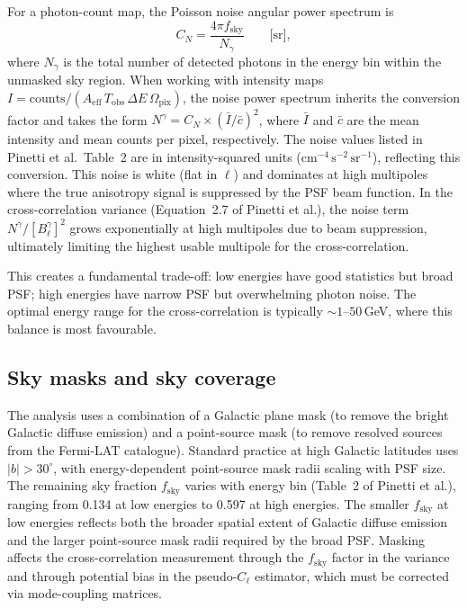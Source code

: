 \documentclass[10pt,a4paper]{article}
\newcommand{\fsky}{f_{\mathrm{sky}}}
\newcommand{\Nph}{N^{\gamma}}
\newcommand{\Cl}{C_\ell}
\begin{document}
For a photon-count map, the Poisson noise angular power spectrum is
\begin{equation}
    C_N = \frac{4\pi \fsky}{N_\gamma}\qquad\text{[sr]},
\end{equation}
where $N_\gamma$ is the total number of detected photons in the energy bin within the unmasked sky region. When working with intensity maps $I = \mathrm{counts}/(A_{\mathrm{eff}}\,T_{\mathrm{obs}}\,\Delta E\,\Omega_{\mathrm{pix}})$, the noise power spectrum inherits the conversion factor and takes the form $\Nph = C_N \times (\bar{I}/\bar{c})^2$, where $\bar{I}$ and $\bar{c}$ are the mean intensity and mean counts per pixel, respectively. The noise values listed in Pinetti et al.\ Table~2 are in intensity-squared units ($\mathrm{cm^{-4}\,s^{-2}\,sr^{-1}}$), reflecting this conversion. This noise is white (flat in $\ell$) and dominates at high multipoles where the true anisotropy signal is suppressed by the PSF beam function. In the cross-correlation variance (Equation~2.7 of Pinetti et al.), the noise term $\Nph / [B_\ell^\gamma]^2$ grows exponentially at high multipoles due to beam suppression, ultimately limiting the highest usable multipole for the cross-correlation.

This creates a fundamental trade-off: low energies have good statistics but broad PSF; high energies have narrow PSF but overwhelming photon noise. The optimal energy range for the cross-correlation is typically $\sim1$--$50$\,GeV, where this balance is most favourable.

\subsection{Sky masks and sky coverage}

The analysis uses a combination of a Galactic plane mask (to remove the bright Galactic diffuse emission) and a point-source mask (to remove resolved sources from the Fermi-LAT catalogue). Standard practice at high Galactic latitudes uses $|b| > 30^\circ$, with energy-dependent point-source mask radii scaling with PSF size. The remaining sky fraction $\fsky$ varies with energy bin (Table~2 of Pinetti et al.), ranging from 0.134 at low energies to 0.597 at high energies. The smaller $\fsky$ at low energies reflects both the broader spatial extent of Galactic diffuse emission and the larger point-source mask radii required by the broad PSF. Masking affects the cross-correlation measurement through the $\fsky$ factor in the variance and through potential bias in the pseudo-$\Cl$ estimator, which must be corrected via mode-coupling matrices.
\end{document}
